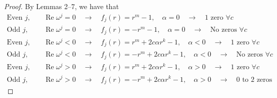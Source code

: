 \documentclass{amsart}
\renewcommand{\Re}{\operatorname{Re}}
\theoremstyle{definition}
\theoremstyle{remark}
\begin{document}
\begin{proof}
By Lemmas 2--7, 
we have that
\begin{align*}
\text{Even } j, &\quad \Re \omega^j  = 0 \hspace{1em} \rightarrow \hspace{1em} f_j(r) = r^m - 1, \quad \alpha = 0 \hspace{1em} \rightarrow \hspace{1em} 1 \text{ zero } \forall c \\[1em]
\text{Odd } j, &\quad \Re \omega^j = 0 \hspace{1em} \rightarrow \hspace{1em} f_j(r) = -r^m - 1, \quad \alpha = 0 \hspace{1em} \rightarrow \hspace{1em} \text{No zeros } \forall c \\[1em]
\text{Even } j, &\quad \Re\omega^j < 0 \hspace{1em} \rightarrow \hspace{1em} f_j(r) = r^m + 2c\alpha r^k - 1, \quad \alpha < 0 \hspace{1em} \rightarrow \hspace{1em} 1 \text{ zero } \forall c \\[1em]
\text{Odd } j, &\quad \Re\omega^j < 0 \hspace{1em} \rightarrow \hspace{1em} f_j(r) = -r^m + 2c\alpha r^k - 1, \quad \alpha < 0 \hspace{1em} \rightarrow \hspace{1em} \text{No zeros } \forall c \\[1em]
\text{Even } j, &\quad \Re \omega^j > 0 \hspace{1em} \rightarrow \hspace{1em} f_j(r) = r^m + 2c\alpha r^k - 1, \quad \alpha > 0 \hspace{1em} \rightarrow \hspace{1em} 1 \text{ zero } \forall c \\[1em]
\text{Odd } j, &\quad \Re \omega^j > 0 \hspace{1em} \rightarrow \hspace{1em} f_j(r) = -r^m + 2c\alpha r^k - 1, \quad \alpha > 0 \hspace{1em} \rightarrow \hspace{1em} 0 \text{ to } 2 \text{ zeros }%
\end{align*}


\end{proof}
\end{document}
